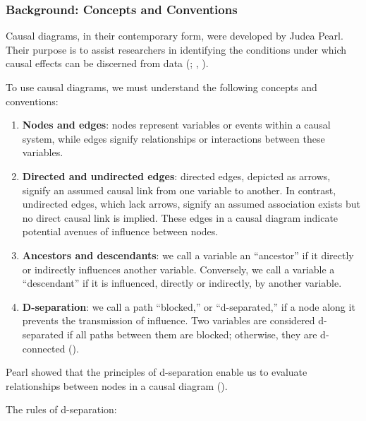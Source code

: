 \documentclass[
  singlecolumn]{article}
\begin{document}
\subsubsection{Background: Concepts and
Conventions}\label{background-concepts-and-conventions}

Causal diagrams, in their contemporary form, were developed by Judea
Pearl. Their purpose is to assist researchers in identifying the
conditions under which causal effects can be discerned from data
(;
, ).

To use causal diagrams, we must understand the following concepts and
conventions:

\begin{enumerate}
\def\labelenumi{\arabic{enumi}.}
\item
  \textbf{Nodes and edges}: nodes represent variables or events within a
  causal system, while edges signify relationships or interactions
  between these variables.
\item
  \textbf{Directed and undirected edges}: directed edges, depicted as
  arrows, signify an assumed causal link from one variable to another.
  In contrast, undirected edges, which lack arrows, signify an assumed
  association exists but no direct causal link is implied. These edges
  in a causal diagram indicate potential avenues of influence between
  nodes.
\item
  \textbf{Ancestors and descendants}: we call a variable an ``ancestor''
  if it directly or indirectly influences another variable. Conversely,
  we call a variable a ``descendant'' if it is influenced, directly or
  indirectly, by another variable.
\item
  \textbf{D-separation}: we call a path ``blocked,'' or ``d-separated,''
  if a node along it prevents the transmission of influence. Two
  variables are considered d-separated if all paths between them are
  blocked; otherwise, they are d-connected
  ().
\end{enumerate}

Pearl showed that the principles of d-separation enable us to evaluate
relationships between nodes in a causal diagram
().

The rules of d-separation:
\end{document}
